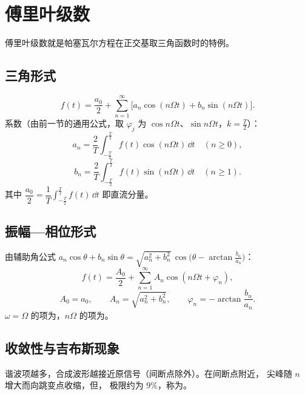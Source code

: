 \section{傅里叶级数}

傅里叶级数就是帕塞瓦尔方程在正交基取三角函数时的特例。

\subsection{三角形式}

\begin{equation}
    f(t)=\frac{a_0}{2}+\sum_{n=1}^{\infty}
    \bigl[a_n\cos(n\Omega t)+b_n\sin(n\Omega t)\bigr].
\end{equation}
系数（由前一节的通用公式，取 $\varphi_j$ 为 $\cos n\Omega t$、$\sin n\Omega t$，$k=\frac{T}{2}$）：
\[
    a_n=\frac{2}{T}\int_{-\frac{T}{2}}^{\frac{T}{2}}f(t)\cos(n\Omega t)\,\dd t
    \quad(n\ge 0),
\]
\[
    b_n=\frac{2}{T}\int_{-\frac{T}{2}}^{\frac{T}{2}}f(t)\sin(n\Omega t)\,\dd t
    \quad(n\ge 1).
\]
其中 $\dfrac{a_0}{2}=\dfrac{1}{T}\displaystyle\int_{-\frac{T}{2}}^{\frac{T}{2}}f(t)\,\dd t$
即直流分量。

\subsection{振幅—相位形式}

由辅助角公式
$a_n\cos\theta+b_n\sin\theta=\sqrt{a_n^{2}+b_n^{2}}\,\cos\bigl(\theta-\arctan\frac{b_n}{a_n}\bigr)$：
\[
    f(t)=\frac{A_0}{2}+\sum_{n=1}^{\infty}A_n\cos(n\Omega t+\varphi_n),
\]
\[
    A_0=a_0,\qquad A_n=\sqrt{a_n^{2}+b_n^{2}},\qquad
    \varphi_n=-\arctan\frac{b_n}{a_n}.
\]
$\omega=\Omega$ 的项为，$n\Omega$ 的项为。

\subsection{收敛性与吉布斯现象}

谐波项越多，合成波形越接近原信号（间断点除外）。在间断点附近，
尖峰随 $n$ 增大而向跳变点收缩，但，
极限约为 $9\%$，称为。

